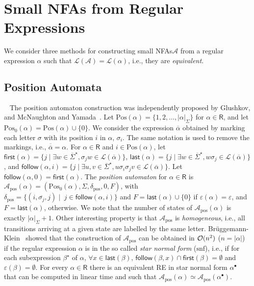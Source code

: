 \documentclass{llncs}
\newcommand{\nfas}{NFAs\xspace}
\newcommand{\RE}{\mathsf{R}}
\newcommand{\re}{RE\xspace}
\newcommand{\lang}{\mathcal{L}}
\newcommand{\snf}{\mbox{$\mathrm{snf}$}\xspace}
\newcommand{\nfa}{\mathcal{A}}
\newcommand{\pos}{{\mathrm{pos}}}
\newcommand{\Pos}{{\mathrm{Pos}}}
\newcommand{\Alphabet}{\Sigma}
\newcommand{\letter}{\sigma}
\newcommand{\first}{\mathsf{first}}
\newcommand{\last}{\mathsf{last}}
\newcommand{\follow}{\mathsf{follow}}
\newcommand{\ommit}[1]{\ }
\begin{document}
\section{Small \nfas from Regular Expressions}
\label{sec:nfas}
We consider three methods for constructing small \nfas $\nfa$ from a
regular expression $\alpha$ such that $\lang(\nfa)=\lang(\alpha)$, i.e.,
they are \emph{equivalent}.

\subsection{Position Automata}
\ommit{ Given a regular expression $\alpha$, it is possible to
  recognize a word of $\lang(\alpha)$ by following the expression
  symbols in an adequate manner. For instance the word $aabab$ can be
  obtained from $a^\star(ba^\star)^\star$ by visiting two times the
  first $a$ and two times the subexpression $(ba^\star)$, visiting
  $b$, visiting the second $a$, visiting $b$ again and finally
  visiting zero times $a$.  It is obvious that the position of each
  letter is important for the word recognition.  } The position
automaton construction was independently proposed by Glushkov, and
McNaughton and Yamada~\cite{glushkov61,mcnaughton60}. Let
$\Pos(\alpha)=\{1,2,\ldots,|\alpha|_\Alphabet\}$ for $\alpha\in \RE$,
and let $\Pos_0(\alpha)=\Pos(\alpha)\cup\{0\}$. We consider the
expression $\overline{\alpha}$ obtained by marking each letter
$\letter$ with its position $i$ in $\alpha$, $\letter_i$. The same
notation is used to remove the markings, i.e.,
$\overline{\overline{\alpha}}=\alpha$.  For $\alpha\in\RE$ and $i \in
\Pos(\alpha)$, let $\first(\alpha)=\{j\mid \exists w\in
\overline{\Alphabet}^\star, \letter_jw\in \lang(\overline{\alpha})\}$,
$\last(\alpha)=\{j\mid \exists w\in \overline{\Alphabet}^\star,
w\letter_j\in \lang(\overline{\alpha})\}$, and
$\follow(\alpha,i)=\{j\mid \exists u,v\in \overline{\Alphabet}^\star,
u\letter_i\letter_jv\in \lang(\overline{\alpha})\}$. Let
$\follow(\alpha,0)=\first(\alpha)$. The \emph{position automaton} for
$\alpha\in\RE$ is
$\nfa_\pos(\alpha)=(\Pos_0(\alpha),\Alphabet,\delta_\pos,0,F)$, with
$\delta_\pos=\{(i,\overline{\letter_j},j)\mid\;
j\in\follow(\alpha,i)\}$ and $F=\last(\alpha)\cup\{0\}$ if
$\varepsilon(\alpha)=\varepsilon$, and $F=\last(\alpha)$,
otherwise. We note that the number of states of $\nfa_\pos(\alpha)$ is
exactly $|\alpha|_\Alphabet+1$. Other interesting property is that
$\nfa_\pos$ is \emph{homogeneous}, i.e., all transitions arriving at a
given state are labelled by the same
letter. Brüggemann-Klein~\cite{bruggemann-klein93:_regul_expres_into_finit_autom}
showed that the construction of $\nfa_\pos$ can be obtained in ${\cal
  O}(n^2)$ ($n=|\alpha|$)
if the regular expression $\alpha$ is
in the so called \emph{star normal form} (\snf), i.e., if for each
subexpression $\beta^\star$ of $\alpha$, $\forall x\in
\last(\beta),\,\follow(\beta,x)\cap \first(\beta)=\emptyset$ and
$\varepsilon(\beta)=\emptyset$. For every $\alpha\in \RE$ there is an
equivalent \re in star normal form $\alpha^\bullet$ that can be
computed in linear time and such that
$\nfa_\pos(\alpha)\simeq\nfa_\pos(\alpha^\bullet)$.
\end{document}
